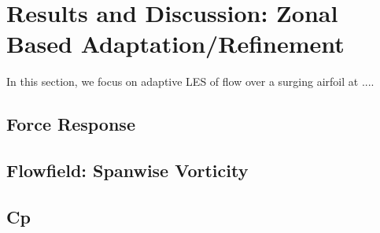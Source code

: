 \chapter{Results and Discussion: Zonal Based Adaptation/Refinement}

In this section, we focus on adaptive LES of flow over a surging airfoil at ....



\section{Force Response}

\label{sec:zonal_force_response}

\section{Flowfield: Spanwise Vorticity}

\label{sec:zonal_vorticity}

\section{Cp}

\label{sec:zonal_cp}
